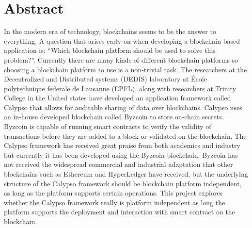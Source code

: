 \documentclass[12pt]{article}
\begin{document}

\tableofcontents
\pagebreak


\section{Abstract}
In the modern era of technology, blockchains seems to be the answer to everything. A question that arises early on when developing a blockchain based application is: “Which blockchain platform should be used to solve this problem?”. Currently there are many kinds of different blockchain platforms so choosing a blockchain platform to use is a non-trivial task. The researchers at the Decentralized and Distributed systems (DEDIS) laboratory at École polytechnique federale de Lausanne (EPFL),  along with researchers at Trinity College in the United states have developed an application framework called Calypso\cite{cryptoeprint:2018:209} that allows for auditable sharing of data over blockchains. Calypso uses an in-house developed blockchain called Byzcoin to store on-chain secrets. Byzcoin is capable of running smart contracts to verify the validity of transactions before they are added to a block or validated on the blockchain. 
The Calypso framework has received great praise from both academics and industry but currently it has been developed using the Byzcoin blockchain. Byzcoin has not received the widespread commercial and industrial adaptation that other blockchains such as Ethereum and HyperLedger have received, but the underlying structure of the Calypso framework should be blockchain platform independent, as long as the platform supports certain operations. This project explores whether the Calypso framework really is platform independent as long the platform supports the deployment and interaction with smart contract on the blockchain. 
\end{document}
